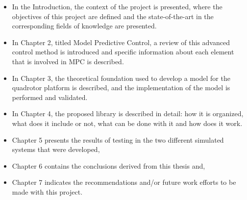\begin{itemize} \itemsep0pt
\item[] In the Introduction, the context of the project is presented, where the objectives of this project are defined and the state-of-the-art in the corresponding fields of knowledge are presented. 
\item[] In Chapter 2, titled Model Predictive Control, a review of this advanced control method is introduced and specific information about each element that is involved in MPC is described. 
\item[] In Chapter 3, the theoretical foundation used to develop a model for the quadrotor platform is described, and the implementation of the model is performed and validated. 
\item[] In Chapter 4, the proposed library is described in detail: how it is organized, what does it include or not, what can be done with it and how does it work. 
\item[] Chapter 5 presents the results of testing in the two different simulated systems that were developed, 
\item[] Chapter 6 contains the conclusions derived from this thesis and,
\item[] Chapter 7 indicates the recommendations and/or future work efforts to be made with this project.  
\end{itemize}
 	




 
